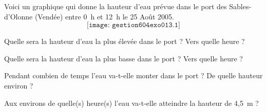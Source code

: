 Voici un graphique qui donne la hauteur d'eau prévue dans le port des Sables-d'Olonne (Vendée) entre 0~h et 12~h le 25 Août 2005.
\[\texttt{[image: gestion604exo013.1]}\]
\begin{myenumerate}
  \item Quelle sera la hauteur d'eau la plus élevée dans le port ? Vers quelle heure ?
  \item Quelle sera la hauteur d'eau la plus basse dans le port ? Vers quelle heure ?
  \item Pendant combien de temps l'eau va-t-elle monter dans le port ? De quelle hauteur environ ?
  \item Aux environs de quelle(s) heure(s) l'eau va-t-elle atteindre la hauteur de 4,5~m ?
\end{myenumerate}